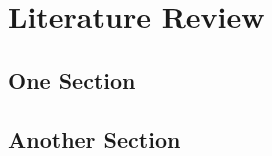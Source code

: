 \chapter{Literature Review}\label{chap:literature_review}

\section{One Section}
\section{Another Section}